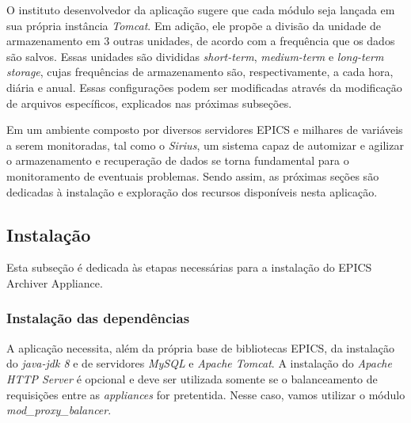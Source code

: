 \FloatBarrier

O instituto desenvolvedor da aplicação sugere que cada módulo seja lançada em
sua própria instância \textit{Tomcat}. Em adição, ele propõe a divisão da
unidade de armazenamento em 3 outras unidades, de acordo com a frequência que os
dados são salvos. Essas unidades são divididas \textit{short-term},
\textit{medium-term} e \textit{long-term storage}, cujas frequências de
armazenamento são, respectivamente, a cada hora, diária e anual. Essas
configurações podem ser modificadas através da modificação de arquivos
específicos, explicados nas próximas subseções.

\vspace{12pt}


Em um ambiente composto por diversos servidores EPICS e milhares de variáveis a
serem monitoradas, tal como o \textit{Sirius}, um sistema capaz de automizar e
agilizar o armazenamento e recuperação de dados se torna fundamental para o
monitoramento de eventuais problemas. Sendo assim, as próximas seções são
dedicadas à instalação e exploração dos recursos disponíveis nesta aplicação.
\subsection {Instalação}

Esta subseção é dedicada às etapas necessárias para a instalação do EPICS
Archiver Appliance.

\subsubsection {Instalação das dependências}

A aplicação necessita, além da própria base de bibliotecas EPICS, da
instalação do \textit{java-jdk 8} e de servidores \textit{MySQL} e
\textit{Apache Tomcat}. A instalação do \textit{Apache HTTP Server} é opcional e
deve ser utilizada somente se o balanceamento de requisições entre as
\textit{appliances} for pretentida. Nesse caso, vamos utilizar o módulo
\textit{mod\_proxy\_balancer}.

